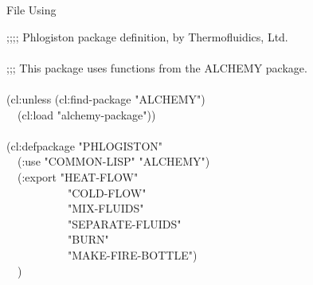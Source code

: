 \begin{table}[t]
\caption{File \protect{} Using \protect{}}
\label{DEFPACKAGE-PHLOGISTON-PACKAGE-TABLE}
\begin{lisp}
;;;; Phlogiston package definition, by Thermofluidics, Ltd. \\
 \\
;;; This package uses functions from the ALCHEMY package. \\
 \\
(cl:unless (cl:find-package "ALCHEMY") \\
~~(cl:load "alchemy-package")) \\
 \\
(cl:defpackage "PHLOGISTON" \\
~~(:use "COMMON-LISP" "ALCHEMY") \\
~~(:export "HEAT-FLOW" \\
~~~~~~~~~~~"COLD-FLOW" \\
~~~~~~~~~~~"MIX-FLUIDS" \\
~~~~~~~~~~~"SEPARATE-FLUIDS" \\
~~~~~~~~~~~"BURN" \\
~~~~~~~~~~~"MAKE-FIRE-BOTTLE") \\
~~)
\end{lisp}
\end{table}

